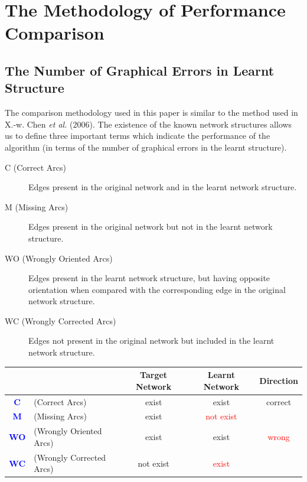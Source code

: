 \documentclass[runningheads,a4paper]{llncs}
\begin{document}
\section{The Methodology of Performance Comparison}

\subsection{The Number of Graphical Errors in Learnt Structure}

The comparison methodology used in this paper is similar to the method used in X.-w. Chen \emph{et al.} (2006). The existence of the known network structures allows us to define three important terms which indicate the performance of the algorithm (in terms of the number of graphical errors in the learnt structure).

\begin{description}
	\item[C (Correct Arcs)] Edges present in the original network and in the learnt network structure.
	
	\item[M (Missing Arcs)] Edges present in the original network but not in the learnt network structure.
	
	\item[WO (Wrongly Oriented Arcs)] Edges present in the learnt network structure, but having opposite orientation when compared with the corresponding edge in the original network structure.
	
	\item[WC (Wrongly Corrected Arcs)] Edges not present in the original network but included in the learnt network structure.
\end{description}

\begin{center}
	\begin{tabular}{c|l|c|c|c}
		\hline 
		& & \textbf{Target Network} & \textbf{Learnt Network} & \textbf{Direction}\tabularnewline
		\hline 
		\textbf{\textcolor{blue}{C}} & (Correct Arcs) & exist & exist & correct\tabularnewline
		\textbf{\textcolor{blue}{M}} & (Missing Arcs) & exist & \textcolor{red}{not exist} & \tabularnewline
		\textbf{\textcolor{blue}{WO}} & (Wrongly Oriented Arcs) & exist & exist & \textcolor{red}{wrong}\tabularnewline
		\textbf{\textcolor{blue}{WC}} & (Wrongly Corrected Arcs) & not exist & \textcolor{red}{exist} & \tabularnewline
		\hline 
	\end{tabular}
\end{center}
\end{document}
